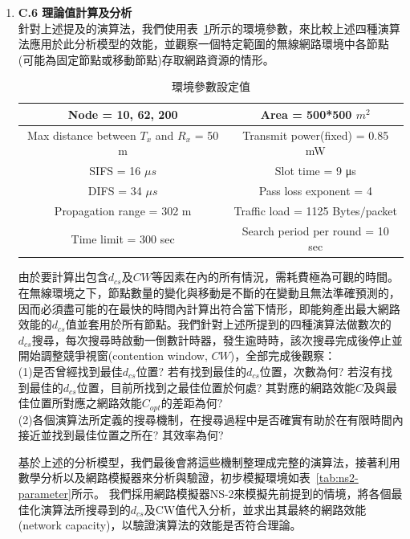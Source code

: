 \documentclass[12pt,a4paper]{article}
\newcommand{\Tab}[1]{表~\ref{#1}}
\begin{document}
\begin{description}
\begin{enumerate}
\item [\bf ]{\textbf{\Kai C.6 理論值計算及分析 }}\\

針對上述提及的演算法，我們使用\Tab{tab:env-parameter}所示的環境參數，來比較上述四種演算法應用於此分析模型的效能，並觀察一個特定範圍的無線網路環境中各節點(可能為固定節點或移動節點)存取網路資源的情形。

\begin{table}[!htb]
\centering
\caption{環境參數設定值}
\vspace{0.2cm}
\small
\begin{tabular}{|c|c|}
\hline
Node = 10, 62, 200 & Area = 500*500 $m^2$ \\
\hline
Max distance between $T_x$ and $R_x$ = 50 m & Transmit power(fixed) = 0.85 mW \\
\hline
SIFS = 16 $\mu s$ & Slot time = 9 μs \\
\hline
DIFS = 34 $\mu s$ & Pass loss exponent = 4 \\
\hline
Propagation range = 302 m & Traffic load = 1125 Bytes$/$packet\\
\hline
Time limit = 300 sec & Search period per round = 10 sec\\
\hline
\end{tabular}
\label{tab:env-parameter}
\end{table}

由於要計算出包含$d_{cs}$及$CW$等因素在內的所有情況，需耗費極為可觀的時間。在無線環境之下，節點數量的變化與移動是不斷的在變動且無法準確預測的，因而必須盡可能的在最快的時間內計算出符合當下情形，即能夠產出最大網路效能的$d_{cs}$值並套用於所有節點。我們針對上述所提到的四種演算法做數次的$d_{cs}$搜尋，每次搜尋時啟動一倒數計時器，發生逾時時，該次搜尋完成後停止並開始調整競爭視窗(contention window, $CW$)，全部完成後觀察：\\
(1)是否曾經找到最佳$d_{cs}$位置? 若有找到最佳的$d_{cs}$位置，次數為何? 若沒有找到最佳的$d_{cs}$位置，目前所找到之最佳位置於何處? 其對應的網路效能$C$及與最佳位置所對應之網路效能$C_{opt}$的差距為何? \\
(2)各個演算法所定義的搜尋機制，在搜尋過程中是否確實有助於在有限時間內接近並找到最佳位置之所在? 其效率為何?

基於上述的分析模型，我們最後會將這些機制整理成完整的演算法，接著利用數學分析以及網路模擬器來分析與驗證，初步模擬環境如\Tab{tab:ns2-parameter}所示。
我們採用網路模擬器NS-2來模擬先前提到的情境，將各個最佳化演算法所搜尋到的$d_{cs}$及CW值代入分析，並求出其最終的網路效能(network capacity)，以驗證演算法的效能是否符合理論。\\




\end{enumerate}
\end{description}
\end{document}
